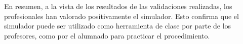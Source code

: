 



En resumen, a la vista de los resultados de las validaciones realizadas, los profesionales han valorado positivamente el simulador. Esto confirma que el simulador puede ser utilizado como herramienta de clase por parte de los profesores, como por el alumnado para practicar el procedimiento. 

